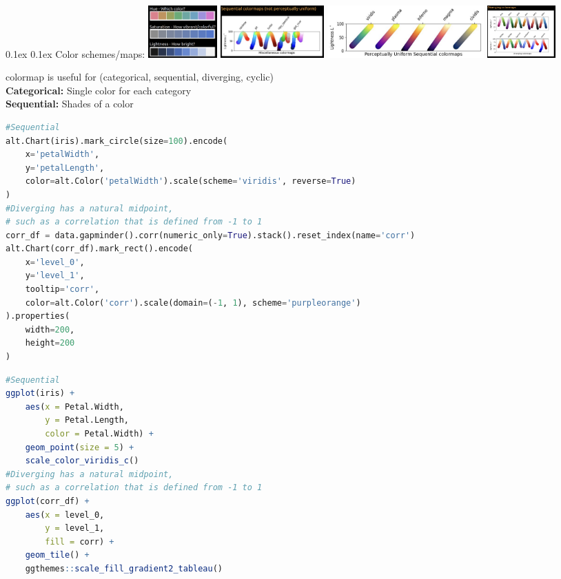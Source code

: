 \documentclass[8pt,landscape]{article}
\makeatletter
\renewcommand{\subsection}{\@startsection{subsection}{2}{0pt}%
    {0.1ex}%
    {0.1ex}%
    {\fontsize{8}{9}\bfseries\color{blue}}} %
\newcommand{\smalltext}[1]{%
  {\fontsize{8}{9}\selectfont\sloppy #1\par}%
}
\makeatother
\begin{document}
\begin{multicols}{3}
\subsection{Color schemes/maps:}
\includegraphics[width=0.5\linewidth, height=2cm]{HSL.png}
\includegraphics[width=0.5\linewidth, height=2cm]{seq-not.png}
\includegraphics[width=0.5\linewidth, height=2cm]{seq.png}
\includegraphics[width=0.5\linewidth, height=2cm]{diverge.png}
\smalltext{
colormap is useful for (categorical, sequential, diverging, cyclic) \\
\textbf{Categorical:} Single color for each category \\
\textbf{Sequential:} Shades of a color \\
}
\begin{lstlisting}[language=Python]
#Sequential
alt.Chart(iris).mark_circle(size=100).encode(
    x='petalWidth',
    y='petalLength',
    color=alt.Color('petalWidth').scale(scheme='viridis', reverse=True)
)
#Diverging has a natural midpoint, 
# such as a correlation that is defined from -1 to 1
corr_df = data.gapminder().corr(numeric_only=True).stack().reset_index(name='corr')
alt.Chart(corr_df).mark_rect().encode(
    x='level_0',
    y='level_1',
    tooltip='corr',
    color=alt.Color('corr').scale(domain=(-1, 1), scheme='purpleorange')
).properties(
    width=200,
    height=200
)
\end{lstlisting}
\begin{lstlisting}[language=R]
#Sequential
ggplot(iris) + 
    aes(x = Petal.Width,
        y = Petal.Length,
        color = Petal.Width) +
    geom_point(size = 5) +
    scale_color_viridis_c()
#Diverging has a natural midpoint, 
# such as a correlation that is defined from -1 to 1
ggplot(corr_df) +
    aes(x = level_0,
        y = level_1,
        fill = corr) +
    geom_tile() +
    ggthemes::scale_fill_gradient2_tableau()
\end{lstlisting}


\end{multicols}
\end{document}
